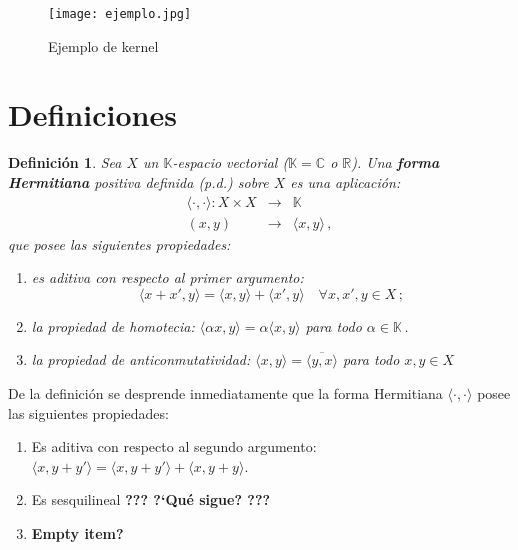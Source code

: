 \documentclass[12pt,reqno]{amsart}
\newtheorem*{mydef}{Definici\'on}
\begin{document}
\begin{figure}[ht!]
\centering
\texttt{[image: ejemplo.jpg]}
\caption{Ejemplo de kernel}
\label{ejemplo}
\end{figure}








\bigskip
\section{Definiciones}\label{sec:def}

\begin{mydef}
Sea $X$ un $\mathbb{K}$-espacio vectorial
{\rm ($\mathbb{K}=\mathbb{C}$ o $\mathbb{R}$)}. 
Una \textbf{forma Hermitiana} positiva definida (p.d.) sobre $X$
es una aplicaci\'on:
\begin{eqnarray*}
\langle\cdot,\cdot\rangle: X\times X & \rightarrow & \mathbb{K} \\
(x,y) & \rightarrow & \langle x,y \rangle\,,
\end{eqnarray*}
que posee las siguientes propiedades:
\begin{enumerate}
\item
es aditiva con respecto al primer argumento:
$$
\langle x+x',y \rangle = \langle x,y \rangle + \langle x',y \rangle
\quad \forall x,x',y \in X\,;
$$
\item
la propiedad de homotecia:
$\langle\alpha x,y\rangle = \alpha\langle x,y\rangle$ 
para todo $\alpha\in\mathbb{K}$\,.
\item
la propiedad de anticonmutatividad:
$\langle x,y\rangle=\overline{\langle y,x\rangle}$
para todo $x,y\in X$
\end{enumerate}
\end{mydef}

\smallskip\noindent
De la definici\'on se desprende inmediatamente que la forma Hermitiana
$\langle\cdot,\cdot\rangle$ posee las siguientes propiedades:
\begin{enumerate}
\item
Es aditiva con respecto al segundo argumento:
$\langle x,y+y'\rangle = \langle x,y+y'\rangle+\langle x,y+y\rangle$.
\item
Es sesquilineal {\color{red}\bf ??? ?`Qu\'e sigue? ???}
\item
{\color{red}\bf Empty item?}
\end{enumerate}
\end{document}
